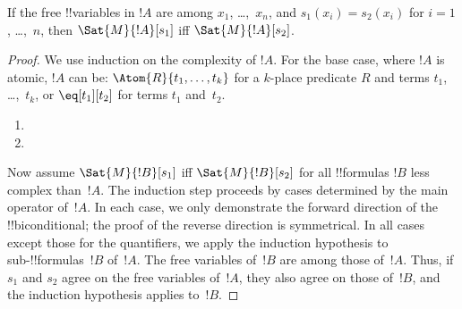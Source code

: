 \documentclass[../../../include/open-logic-section]{subfiles}
\begin{document}
\begin{prop}
If the free !!{variable}s in $!A$ are among $x_1$, \dots,~$x_n$, and
$s_1(x_i) = s_2(x_i)$ for $i = 1$, \dots,~$n$, then $\Sat{M}{!A}[s_1]$
iff $\Sat{M}{!A}[s_2]$.
\end{prop}

\begin{proof}
We use induction on the complexity of $!A$. For the base case, where
$!A$ is atomic, $!A$ can be:
$\Atom{R}{t_1, \dots, t_k}$ for a $k$-place predicate $R$ and terms
$t_1$, \dots,~$t_k$, or $\eq[t_1][t_2]$ for terms $t_1$ and~$t_2$.

\begin{enumerate}


\item
\item
\end{enumerate}

Now assume $\Sat{M}{!B}[s_1]$ iff $\Sat{M}{!B}[s_2]$ for all
!!{formula}s $!B$ less complex than~$!A$. The induction step proceeds
by cases determined by the main operator of~$!A$. In each case, we
only demonstrate the forward direction of the !!{biconditional}; the
proof of the reverse direction is symmetrical. In all cases except
those for the quantifiers, we apply the induction hypothesis to
sub-!!{formula}s~$!B$ of~$!A$.  The free variables of~$!B$ are among
those of~$!A$. Thus, if $s_1$ and $s_2$ agree on the free variables
of~$!A$, they also agree on those of~$!B$, and the induction
hypothesis applies to~$!B$.


\end{proof}
\end{document}
